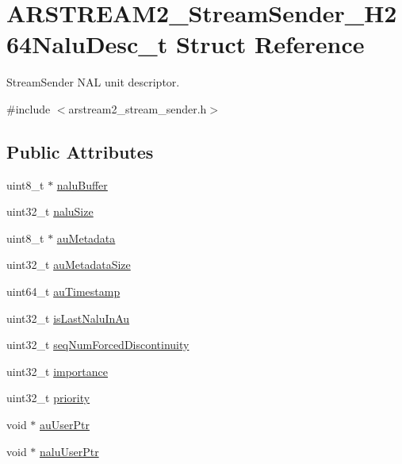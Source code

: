 \hypertarget{struct_a_r_s_t_r_e_a_m2___stream_sender___h264_nalu_desc__t}{}\section{A\+R\+S\+T\+R\+E\+A\+M2\+\_\+\+Stream\+Sender\+\_\+\+H264\+Nalu\+Desc\+\_\+t Struct Reference}
\label{struct_a_r_s_t_r_e_a_m2___stream_sender___h264_nalu_desc__t}


Stream\+Sender N\+AL unit descriptor.  




{\ttfamily \#include $<$arstream2\+\_\+stream\+\_\+sender.\+h$>$}

\subsection*{Public Attributes}
\begin{DoxyCompactItemize}
\item 
uint8\+\_\+t $\ast$ \hyperlink{struct_a_r_s_t_r_e_a_m2___stream_sender___h264_nalu_desc__t_a62cf4542fca0551bdfba92bf8ea5766c}{nalu\+Buffer}
\item 
uint32\+\_\+t \hyperlink{struct_a_r_s_t_r_e_a_m2___stream_sender___h264_nalu_desc__t_a79727a50e1b6e2960e12a1a7018dafb0}{nalu\+Size}
\item 
uint8\+\_\+t $\ast$ \hyperlink{struct_a_r_s_t_r_e_a_m2___stream_sender___h264_nalu_desc__t_af8035ecf0b4f87279c6ce7751c7fb75b}{au\+Metadata}
\item 
uint32\+\_\+t \hyperlink{struct_a_r_s_t_r_e_a_m2___stream_sender___h264_nalu_desc__t_a49c450afe16068d0a7bb01c7811ec4eb}{au\+Metadata\+Size}
\item 
uint64\+\_\+t \hyperlink{struct_a_r_s_t_r_e_a_m2___stream_sender___h264_nalu_desc__t_a37bcb9ea4961e06e84080eb5558bd7d2}{au\+Timestamp}
\item 
uint32\+\_\+t \hyperlink{struct_a_r_s_t_r_e_a_m2___stream_sender___h264_nalu_desc__t_a3e6fc372456253eaa5e992135e5e516d}{is\+Last\+Nalu\+In\+Au}
\item 
uint32\+\_\+t \hyperlink{struct_a_r_s_t_r_e_a_m2___stream_sender___h264_nalu_desc__t_a5eb58d803a57d57ac7a38b40f2cd590e}{seq\+Num\+Forced\+Discontinuity}
\item 
uint32\+\_\+t \hyperlink{struct_a_r_s_t_r_e_a_m2___stream_sender___h264_nalu_desc__t_a7b59e4dee14c0d06622c6b1e7dd39b77}{importance}
\item 
uint32\+\_\+t \hyperlink{struct_a_r_s_t_r_e_a_m2___stream_sender___h264_nalu_desc__t_a0a0e585271efa213f8c3641531edcd54}{priority}
\item 
void $\ast$ \hyperlink{struct_a_r_s_t_r_e_a_m2___stream_sender___h264_nalu_desc__t_a5528fa014c61360c0abd01775f23ec9d}{au\+User\+Ptr}
\item 
void $\ast$ \hyperlink{struct_a_r_s_t_r_e_a_m2___stream_sender___h264_nalu_desc__t_add69d20cc84476ff31baeabfe43c672d}{nalu\+User\+Ptr}
\end{DoxyCompactItemize}



